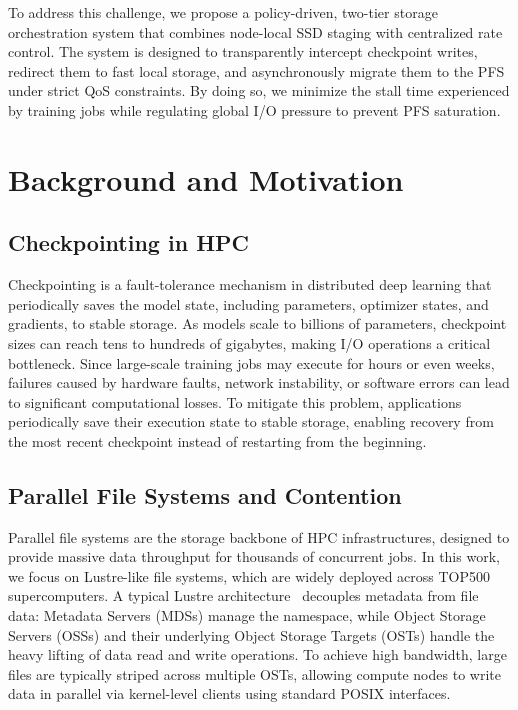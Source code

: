 \documentclass[sigplan,twocolumn,10pt,nonacm]{acmart}
\begin{document}
To address this challenge, we propose a policy-driven, two-tier storage orchestration system that combines node-local SSD staging
with centralized rate control. The system is designed to transparently intercept checkpoint writes, redirect them to fast local
storage, and asynchronously migrate them to the PFS under strict QoS constraints. By doing so, we minimize
the stall time experienced by training jobs while regulating global I/O pressure to prevent PFS saturation.

\section{Background and Motivation}

\subsection{Checkpointing in HPC}

Checkpointing is a fault-tolerance mechanism in distributed deep learning that periodically saves the model state, including
parameters, optimizer states, and gradients, to stable storage. As models scale to billions of parameters, checkpoint sizes
can reach tens to hundreds of gigabytes, making I/O operations a critical bottleneck. Since large-scale training jobs may execute
for hours or even weeks, failures caused by hardware faults, network instability, or software errors can lead to significant
computational losses. To mitigate this problem, applications periodically save their execution state to stable storage, enabling
recovery from the most recent checkpoint instead of restarting from the beginning.

\subsection{Parallel File Systems and Contention}

Parallel file systems are the storage backbone of HPC infrastructures, designed to provide massive data throughput for thousands of
concurrent jobs. In this work, we focus on Lustre-like file systems, which are widely deployed across TOP500 supercomputers. A typical
Lustre architecture~\cite{lustre_pfs} decouples metadata from file data: Metadata Servers (MDSs) manage the namespace, while Object Storage Servers (OSSs)
and their underlying Object Storage Targets (OSTs) handle the heavy lifting of data read and write operations. To achieve high bandwidth,
large files are typically striped across multiple OSTs, allowing compute nodes to write data in parallel via kernel-level clients using
standard POSIX interfaces.
\end{document}
